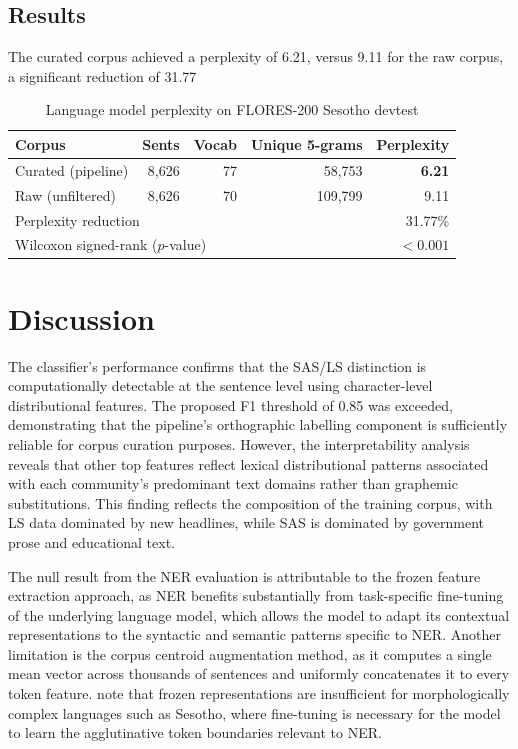 \documentclass[12pt]{ThesisRU}
\begin{document}
\subsection{Results}
The curated corpus achieved a perplexity of 6.21, versus 9.11 for the raw corpus, a significant reduction of 31.77%


\begin{table}[ht]
    \centering
    \begin{tabular}{lrrrr}
    \toprule
    \textbf{Corpus} & \textbf{Sents} & \textbf{Vocab}
                    & \textbf{Unique 5-grams} & \textbf{Perplexity} \\
    \midrule
    Curated (pipeline) & 8,626 & 77 & 58,753 & \textbf{6.21} \\
    Raw (unfiltered)   & 8,626 & 70 & 109,799 & 9.11 \\
    \midrule
    \multicolumn{4}{l}{Perplexity reduction} & 31.77\% \\
    \multicolumn{4}{l}{Wilcoxon signed-rank ($p$-value)} & $< 0.001$ \\
    \bottomrule
    \end{tabular}
    \caption{Language model perplexity on FLORES-200 Sesotho devtest}
    \label{tab:per_results}
\end{table}


\section{Discussion}

The classifier's performance confirms that the SAS/LS distinction is computationally detectable at the sentence level using character-level distributional features. The proposed F1 threshold of 0.85 was exceeded, demonstrating that the pipeline's orthographic labelling component is sufficiently reliable for corpus curation purposes. However, the interpretability analysis reveals that other top features reflect lexical distributional patterns associated with each community's predominant text domains rather than graphemic substitutions. This finding reflects the composition of the training corpus, with LS data dominated by new headlines, while SAS is dominated by government prose and educational text.

The null result from the NER evaluation is attributable to the frozen feature extraction approach, as NER benefits substantially from task-specific fine-tuning of the underlying language model, which allows the model to adapt its contextual representations to the syntactic and semantic patterns specific to NER. Another limitation is the corpus centroid augmentation method, as it computes a single mean vector across thousands of sentences and uniformly concatenates it to every token feature. \citet{gumede2025creating} note that frozen representations are insufficient for morphologically complex languages such as Sesotho, where fine-tuning is necessary for the model to learn the agglutinative token boundaries relevant to NER. 
\end{document}
